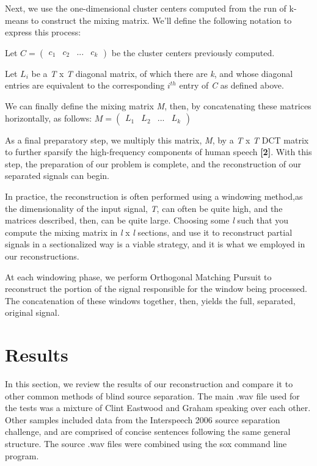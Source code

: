 \documentclass{article}
\begin{document}
Next, we use the one-dimensional cluster centers computed from the run of k-means to construct the mixing matrix. We'll define the following notation to express this process:

Let $C = \left( \begin{smallmatrix} c_{1}&c_{2}&...&c_{\textit{k}} \end{smallmatrix} \right)$ be the cluster centers previously computed. 

Let \textit{$L_{i}$} be a \textit{T} x \textit{T} diagonal matrix, of which there are \textit{k}, and whose diagonal entries are equivalent to the corresponding \textit{$i^{th}$} entry of \textit{C} as defined above.
 
We can finally define the mixing matrix \textit{M}, then, by concatenating these matrices horizontally, as follows: $M = \left( \begin{smallmatrix} L_{1}&L_{2}&...&L_{\textit{k}}  \end{smallmatrix} \right)$

As a final preparatory step, we multiply this matrix, \textit{M}, by a \textit{T} x \textit{T} DCT matrix to further sparsify the high-frequency components of human speech \textbf{[2]}. With this step, the preparation of our problem is complete, and the reconstruction of our separated signals can begin.

In practice, the reconstruction is often performed using a windowing method,as the dimensionality of the input signal, \textit{T}, can often be quite high, and the matrices described, then, can be quite large. Choosing some \textit{l} such that you compute the mixing matrix in \textit{l} x \textit{l} sections, and use it to reconstruct partial signals in a sectionalized way is a viable strategy, and it is what we employed in our reconstructions.

At each windowing phase, we perform Orthogonal Matching Pursuit to reconstruct the portion of the signal responsible for the window being processed. The concatenation of these windows together, then, yields the full, separated, original signal.


\section{Results}
In this section, we review the results of our reconstruction and compare it to other common methods of blind source separation. The main .wav file used for the tests was a mixture of Clint Eastwood and Graham speaking over each other. Other samples included data from the Interspeech 2006 source separation challenge, and are comprised of concise sentences following the same general structure. The source .wav files were combined using the sox command line program. 
\end{document}

